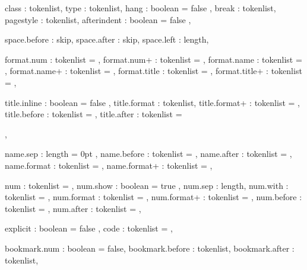   {
    class           : tokenlist,
    type            : tokenlist,
    hang            : boolean   = { false },
    break           : tokenlist,
    pagestyle       : tokenlist,
    afterindent     : boolean   = { false },

    space.before    : skip,
    space.after     : skip,
    space.left      : length,

    format.num      : tokenlist  = ,
    format.num+     : tokenlist  = ,
    format.name     : tokenlist  = ,
    format.name+    : tokenlist  = ,
    format.title    : tokenlist  = ,
    format.title+   : tokenlist  = ,

    title.inline    : boolean    = { false }, 
    title.format    : tokenlist,
    title.format+   : tokenlist  = { },
    title.before    : tokenlist  = { },
    title.after     : tokenlist  = { \par },

    name.sep        : length     = { 0pt },
    name.before     : tokenlist  = { },
    name.after      : tokenlist  = { },
    name.format     : tokenlist  = { },
    name.format+    : tokenlist  = { },

    num             : tokenlist  = { },
    num.show        : boolean    = { true },
    num.sep         : length,
    num.with        : tokenlist  = { },
    num.format      : tokenlist  = { },
    num.format+     : tokenlist  = { },
    num.before      : tokenlist  = { },
    num.after       : tokenlist  = { },

    explicit        : boolean    = { false },
    code            : tokenlist  = { },

    bookmark.num    : boolean    = false,
    bookmark.before : tokenlist,
    bookmark.after  : tokenlist,
  }
